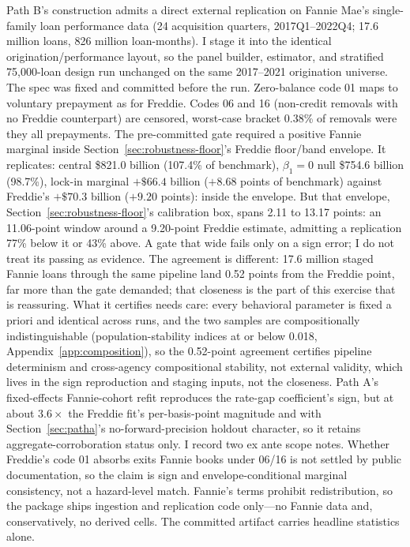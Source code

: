 \documentclass[12pt]{article}
\begin{document}
Path B's construction admits a direct external replication on Fannie Mae's single-family loan performance data (24 acquisition quarters, 2017Q1--2022Q4; 17.6 million loans, 826 million loan-months). I stage it into the identical origination/performance layout, so the panel builder, estimator, and stratified 75{,}000-loan design run unchanged on the same 2017--2021 origination universe. The spec was fixed and committed before the run. Zero-balance code 01 maps to voluntary prepayment as for Freddie. Codes 06 and 16 (non-credit removals with no Freddie counterpart) are censored, worst-case bracket 0.38\% of removals were they all prepayments. The pre-committed gate required a positive Fannie marginal inside Section~\ref{sec:robustness-floor}'s Freddie floor/band envelope. It replicates: central \$821.0 billion (107.4\% of benchmark), $\beta_1 = 0$ null \$754.6 billion (98.7\%), lock-in marginal $+\$66.4$ billion ($+8.68$ points of benchmark) against Freddie's $+\$70.3$ billion ($+9.20$ points): inside the envelope. But that envelope, Section~\ref{sec:robustness-floor}'s calibration box, spans 2.11 to 13.17 points: an 11.06-point window around a 9.20-point Freddie estimate, admitting a replication 77\% below it or 43\% above. A gate that wide fails only on a sign error; I do not treat its passing as evidence. The agreement is different: 17.6 million staged Fannie loans through the same pipeline land 0.52 points from the Freddie point, far more than the gate demanded; that closeness is the part of this exercise that is reassuring. What it certifies needs care: every behavioral parameter is fixed a priori and identical across runs, and the two samples are compositionally indistinguishable (population-stability indices at or below 0.018, Appendix~\ref{app:composition}), so the 0.52-point agreement certifies pipeline determinism and cross-agency compositional stability, not external validity, which lives in the sign reproduction and staging inputs, not the closeness. Path A's fixed-effects Fannie-cohort refit reproduces the rate-gap coefficient's sign, but at about $3.6\times$ the Freddie fit's per-basis-point magnitude and with Section~\ref{sec:patha}'s no-forward-precision holdout character, so it retains aggregate-corroboration status only. I record two ex ante scope notes. Whether Freddie's code 01 absorbs exits Fannie books under 06/16 is not settled by public documentation, so the claim is sign and envelope-conditional marginal consistency, not a hazard-level match. Fannie's terms prohibit redistribution, so the package ships ingestion and replication code only---no Fannie data and, conservatively, no derived cells. The committed artifact carries headline statistics alone.
\end{document}
